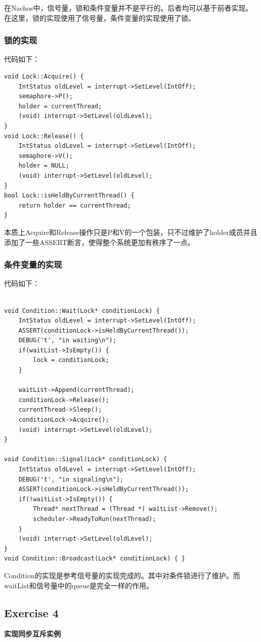 \documentclass[nofonts]{ctexart}
\begin{document}
在Nachos中，信号量，锁和条件变量并不是平行的。后者均可以基于前者实现。在这里，锁的实现使用了信号量，条件变量的实现使用了锁。

\subsubsection*{锁的实现}
代码如下：
\begin{lstlisting}
void Lock::Acquire() {
    IntStatus oldLevel = interrupt->SetLevel(IntOff);
    semaphore->P();
    holder = currentThread;
    (void) interrupt->SetLevel(oldLevel);
}
void Lock::Release() {
    IntStatus oldLevel = interrupt->SetLevel(IntOff);
    semaphore->V();
    holder = NULL;
    (void) interrupt->SetLevel(oldLevel);
}
bool Lock::isHeldByCurrentThread() {
    return holder == currentThread;
}
\end{lstlisting}
本质上Acquire和Release操作只是P和V的一个包装，只不过维护了holder成员并且添加了一些ASSERT断言，使得整个系统更加有秩序了一点。

\subsubsection*{条件变量的实现}
代码如下：
\begin{lstlisting}

void Condition::Wait(Lock* conditionLock) { 
    IntStatus oldLevel = interrupt->SetLevel(IntOff);
    ASSERT(conditionLock->isHeldByCurrentThread());
    DEBUG('t', "in waiting\n");
    if(waitList->IsEmpty()) {
        lock = conditionLock;
    }

    waitList->Append(currentThread);
    conditionLock->Release();
    currentThread->Sleep();
    conditionLock->Acquire();
    (void) interrupt->SetLevel(oldLevel);
}

void Condition::Signal(Lock* conditionLock) { 
    IntStatus oldLevel = interrupt->SetLevel(IntOff);
    DEBUG('t', "in signaling\n");
    ASSERT(conditionLock->isHeldByCurrentThread());
    if(!waitList->IsEmpty()) {
        Thread* nextThread = (Thread *) waitList->Remove();
        scheduler->ReadyToRun(nextThread);
    }
    (void) interrupt->SetLevel(oldLevel);
}
void Condition::Broadcast(Lock* conditionLock) { }

\end{lstlisting}
Condition的实现是参考信号量的实现完成的。其中对条件锁进行了维护。而waitList和信号量中的queue是完全一样的作用。

\subsection*{Exercise 4}
\textbf{实现同步互斥实例}
\end{document}
